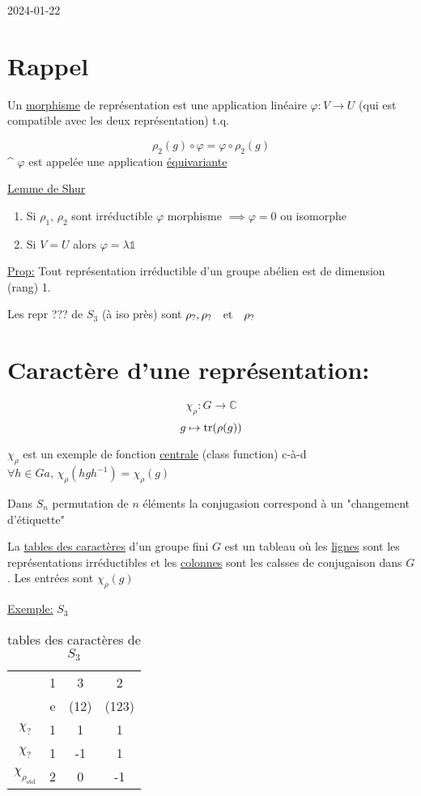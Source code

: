 


2024-01-22

\section*{Rappel}

Un \underline{morphisme}  de représentation est une application linéaire $\varphi:V \to U$ (qui est compatible avec les deux représentation) t.q.

\[ \rho_2 (g) \circ \varphi = \varphi \circ \rho_2 (g) \]
^
$\varphi$ est appelée une application \underline{équivariante} 

\underline{Lemme de Shur} 

\begin{enumerate}
\item	Si $\rho_1,\, \rho_2$ sont irréductible $\varphi$ morphisme $\implies \varphi = 0$ ou isomorphe

\item Si $V=U$ alors $\varphi = \lambda \mathds{1}$
\end{enumerate}

\underline{Prop:} Tout représentation irréductible d'un groupe abélien est de dimension (rang) 1.

Les repr ??? de $S_3$ (à iso près) sont $\rho_?, \rho_? \qq{et} \rho_?$

\section*{Caractère d'une représentation:}

\[ \chi_{\rho} : G \to \mathds{C}  \]
\[ g \mapsto \tr(\rho (g)) \]

$\chi_{\rho} $ est un exemple de fonction \underline{centrale} (class function) c-à-d $\forall h \in Ga,\, \chi_{\rho} (h g h^{-1}) = \chi_{\rho} (g)$

Dans $S_n$ permutation de $n$ éléments la conjugasion correspond à un "changement d'étiquette" 

La \underline{tables des caractères} d'un groupe fini $G$ est un  tableau où les \underline{lignes} sont les représentations irréductibles et les \underline{colonnes} sont les calsses de conjugaison dans $G$. Les entrées sont $\chi_\rho(g)$   

\underline{Exemple:} $S_3$ 

\begin{table}[htpb]
	\centering
	\label{tab:car_s3}

	\begin{tabular}{c|c|c|c}
	&	1 & 3 & 2 \\
	&	e & (12) & (123)\\\hline
		$\chi_?$ & 1 &1 &1 \\\hline 
		$\chi_?$ & 1 & -1 & 1 \\ \hline
		$\chi_{\rho_{\text{std}}}$ & 2 &0 & -1
	\end{tabular}
	\caption{tables des caractères de $S_3$}
\end{table}

